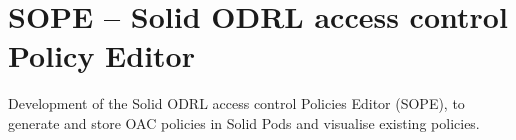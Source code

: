 \section{SOPE -- Solid ODRL access control Policy Editor}
\label{sec:sope}

Development of the Solid ODRL access control Policies Editor (SOPE), to generate and store OAC policies in Solid Pods and visualise existing policies.
